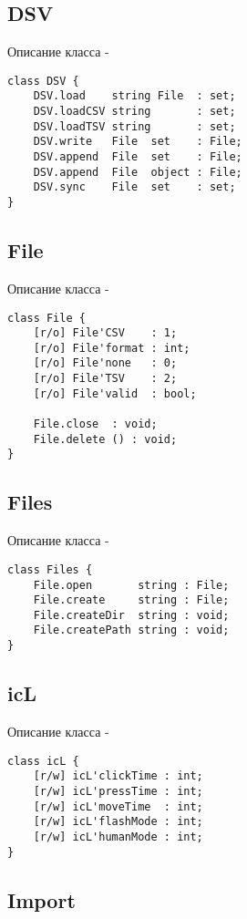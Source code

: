 \subsection{{\color{orange} DSV}}

\noindent Описание класса  -
\begin{lstlisting}[numbers=none]
class DSV {
    DSV.load    string File  : set;
	DSV.loadCSV string       : set;
	DSV.loadTSV string       : set;
	DSV.write   File  set    : File;
	DSV.append  File  set    : File;
	DSV.append  File  object : File;
	DSV.sync    File  set    : set;
}
\end{lstlisting}

\subsection{{\color{orange} File}}

\noindent Описание класса  -
\begin{lstlisting}[numbers=none]
class File {
    [r/o] File'CSV    : 1;
	[r/o] File'format : int;
	[r/o] File'none   : 0;
	[r/o] File'TSV    : 2;
	[r/o] File'valid  : bool;
	
    File.close  : void;
	File.delete () : void;
}
\end{lstlisting}

\subsection{{\color{orange} Files}}

\noindent Описание класса  -
\begin{lstlisting}[numbers=none]
class Files {
    File.open       string : File;
	File.create     string : File;
	File.createDir  string : void;
	File.createPath string : void;
}
\end{lstlisting}

\subsection{{\color{orange} icL}}

\noindent Описание класса  -
\begin{lstlisting}[numbers=none]
class icL {
    [r/w] icL'clickTime : int;
	[r/w] icL'pressTime : int;
	[r/w] icL'moveTime  : int;
	[r/w] icL'flashMode : int;
	[r/w] icL'humanMode : int;
}
\end{lstlisting}

\subsection{{\color{orange} Import}}

